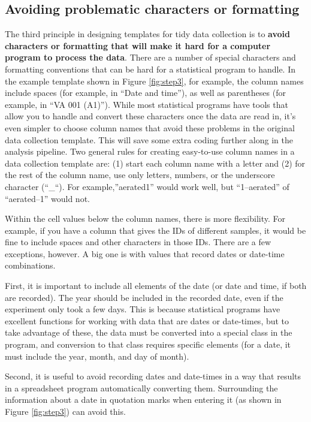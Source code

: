 \documentclass[]{tufte-book}
\begin{document}
\subsection{Avoiding problematic characters or formatting}\label{avoiding-problematic-characters-or-formatting}

The third principle in designing templates for tidy data collection is to
\textbf{avoid characters or formatting that will make it hard for a computer program
to process the data}. There are a number of special characters and formatting
conventions that can be hard for a statistical program to handle. In the example
template shown in Figure \ref{fig:step3}, for example, the column names include
spaces (for example, in ``Date and time''), as well as parentheses (for example,
in ``VA 001 (A1)''). While most statistical programs have tools that allow you to
handle and convert these characters once the data are read in, it's even simpler
to choose column names that avoid these problems in the original data collection
template. This will save some extra coding further along in the analysis
pipeline. Two general rules for creating easy-to-use column names in a data
collection template are: (1) start each column name with a letter and (2) for
the rest of the column name, use only letters, numbers, or the underscore
character (``\_``). For example,''aerated1'' would work well, but ``1--aerated'' of
``aerated--1'' would not.

Within the cell values below the column names, there is more flexibility. For
example, if you have a column that gives the IDs of different samples, it would
be fine to include spaces and other characters in those IDs. There are a few
exceptions, however. A big one is with values that record dates or date-time
combinations.

First, it is important to include all elements of the date (or date and time, if
both are recorded). The year should be included in the recorded
date, even if the experiment only took a few days. This is because statistical
programs have excellent functions for working with data that are dates or
date-times, but to take advantage of these, the data must be converted into a
special class in the program, and conversion to that class requires specific
elements (for a date, it must include the year, month, and day of month).

Second, it is useful to avoid recording dates and date-times in a way that
results in a spreadsheet program automatically converting them. Surrounding the
information about a date in quotation marks when entering it (as shown in Figure
\ref{fig:step3}) can avoid this.
\end{document}
